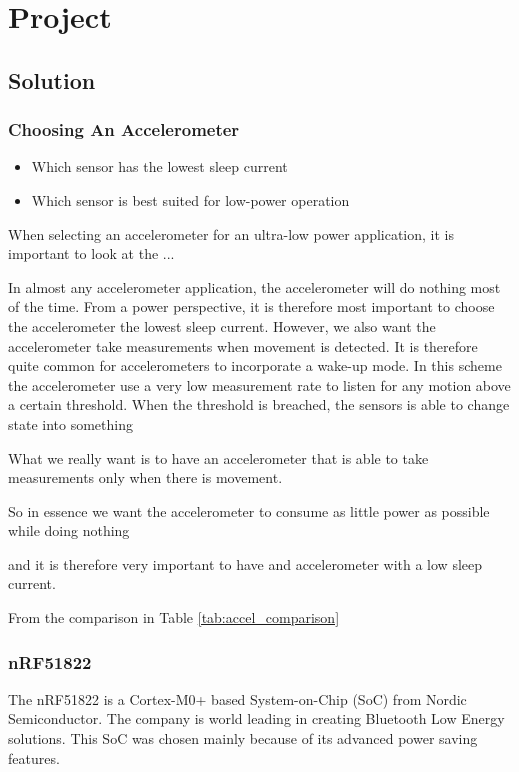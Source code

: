 \chapter{Project}

\section{Solution}

\subsection{Choosing An Accelerometer}

\begin{itemize}
  \item Which sensor has the lowest sleep current
  \item Which sensor is best suited for low-power operation
\end{itemize}

When selecting an accelerometer for an ultra-low power application, it is important to look at the ...

In almost any accelerometer application, the accelerometer will do nothing most of the time. From a power perspective, it is therefore most important to choose the accelerometer the lowest sleep current. However, we also want the accelerometer take measurements when movement is detected. It is therefore quite common for accelerometers to incorporate a wake-up mode. In this scheme the accelerometer use a very low measurement rate to listen for any motion above a certain threshold. When the threshold is breached, the sensors is able to change state into something 

What we really want is to have an accelerometer that is able to take measurements only when there is movement.  

So in essence we want the accelerometer to consume as little power as possible while doing nothing

and it is therefore very important to have and accelerometer with a low sleep current.

From the comparison in Table \ref{tab:accel_comparison}

\subsection{nRF51822}

The nRF51822 is a Cortex-M0+ based System-on-Chip (SoC) from Nordic Semiconductor. The company is world leading in creating Bluetooth Low Energy solutions. This SoC was chosen mainly because of its advanced power saving features. 

